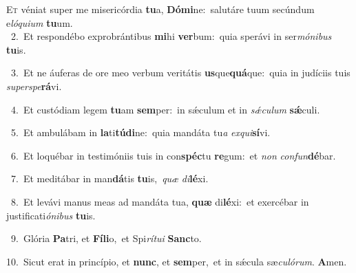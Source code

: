 \lettrine{\initial\textcolor{\initialcolor}{E}}{t} véniat super me misericórdia \textbf{tu}\-a, \textbf{Dó}\-\textbf{mi}ne:~\star salutáre tuum secúndum e\-\textit{ló}\-\textit{qui}\textit{um} \textbf{tu}\-um.\\
{\numbfont\textcolor{\numbcolor}{~2.}}~Et respondébo exprobrántibus \textbf{mi}\-hi \textbf{ver}\-bum:~\star quia sperávi in ser\-\textit{mó}\-\textit{ni}\textit{bus} \textbf{tu}\-is.\par
{\numbfont\textcolor{\numbcolor}{~3.}}~Et ne áuferas de ore meo verbum veritátis \textbf{us}\-que\-\textbf{quá}\-que:~\star quia in judíciis tuis \textit{su}\-\textit{per}\textit{spe}\textbf{rá}vi.\par
{\numbfont\textcolor{\numbcolor}{~4.}}~Et custódiam legem \textbf{tu}\-am \textbf{sem}\-per:~\star in sǽculum et in \textit{sǽ}\-\textit{cu}\textit{lum} \textbf{sǽ}\-culi.\par
{\numbfont\textcolor{\numbcolor}{~5.}}~Et ambulábam in \textbf{la}\-ti\-\textbf{tú}\-\textbf{di}ne:~\star quia mandáta tu\textit{a} \textit{ex}\-\textit{qui}\textbf{sí}vi.\par
{\numbfont\textcolor{\numbcolor}{~6.}}~Et loquébar in testimóniis tuis in con\-\textbf{spéc}\-tu \textbf{re}\-gum:~\star et \textit{non} \textit{con}\-\textit{fun}\textbf{dé}bar.\par
{\numbfont\textcolor{\numbcolor}{~7.}}~Et meditábar in man\-\textbf{dá}\-tis \textbf{tu}\-is,~\star \textit{quæ} \textit{di}\-\textbf{lé}xi.\par
{\numbfont\textcolor{\numbcolor}{~8.}}~Et levávi manus meas ad mandáta tua, \textbf{quæ} di\-\textbf{lé}\-xi:~\star et exercébar in justificati\-\textit{ó}\-\textit{ni}\textit{bus} \textbf{tu}\-is.\par
{\numbfont\textcolor{\numbcolor}{~9.}}~Glória \textbf{Pa}\-tri, et \textbf{Fí}\-\textbf{li}o,~\star et Spi\-\textit{rí}\-\textit{tu}\textit{i} \textbf{Sanc}\-to.\par
{\numbfont\textcolor{\numbcolor}{10.}}~Sicut erat in princípio, et \textbf{nunc}\-, et \textbf{sem}\-per,~\star et in sǽcula sæ\-\textit{cu}\-\textit{ló}\textit{rum}. \textbf{A}\-men.\par
